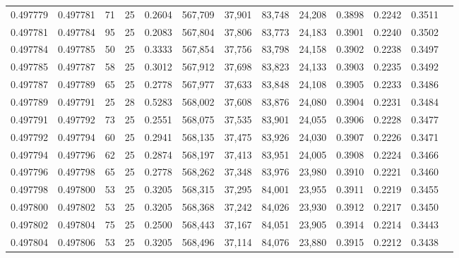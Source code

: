 \begin{tabular}{rrrrrrrrrrrrr}
0.497779 & 0.497781 &    71 &  25 &                                     0.2604 & 567,709 &  37,901 &  83,748 &  24,208 & 0.3898 & 0.2242 & 0.3511 \\
0.497781 & 0.497784 &    95 &  25 &                                     0.2083 & 567,804 &  37,806 &  83,773 &  24,183 & 0.3901 & 0.2240 & 0.3502 \\
0.497784 & 0.497785 &    50 &  25 &                                     0.3333 & 567,854 &  37,756 &  83,798 &  24,158 & 0.3902 & 0.2238 & 0.3497 \\
0.497785 & 0.497787 &    58 &  25 &                                     0.3012 & 567,912 &  37,698 &  83,823 &  24,133 & 0.3903 & 0.2235 & 0.3492 \\
0.497787 & 0.497789 &    65 &  25 &                                     0.2778 & 567,977 &  37,633 &  83,848 &  24,108 & 0.3905 & 0.2233 & 0.3486 \\
0.497789 & 0.497791 &    25 &  28 &                                     0.5283 & 568,002 &  37,608 &  83,876 &  24,080 & 0.3904 & 0.2231 & 0.3484 \\
0.497791 & 0.497792 &    73 &  25 &                                     0.2551 & 568,075 &  37,535 &  83,901 &  24,055 & 0.3906 & 0.2228 & 0.3477 \\
0.497792 & 0.497794 &    60 &  25 &                                     0.2941 & 568,135 &  37,475 &  83,926 &  24,030 & 0.3907 & 0.2226 & 0.3471 \\
0.497794 & 0.497796 &    62 &  25 &                                     0.2874 & 568,197 &  37,413 &  83,951 &  24,005 & 0.3908 & 0.2224 & 0.3466 \\
0.497796 & 0.497798 &    65 &  25 &                                     0.2778 & 568,262 &  37,348 &  83,976 &  23,980 & 0.3910 & 0.2221 & 0.3460 \\
0.497798 & 0.497800 &    53 &  25 &                                     0.3205 & 568,315 &  37,295 &  84,001 &  23,955 & 0.3911 & 0.2219 & 0.3455 \\
0.497800 & 0.497802 &    53 &  25 &                                     0.3205 & 568,368 &  37,242 &  84,026 &  23,930 & 0.3912 & 0.2217 & 0.3450 \\
0.497802 & 0.497804 &    75 &  25 &                                     0.2500 & 568,443 &  37,167 &  84,051 &  23,905 & 0.3914 & 0.2214 & 0.3443 \\
0.497804 & 0.497806 &    53 &  25 &                                     0.3205 & 568,496 &  37,114 &  84,076 &  23,880 & 0.3915 & 0.2212 & 0.3438 \\

\end{tabular}
